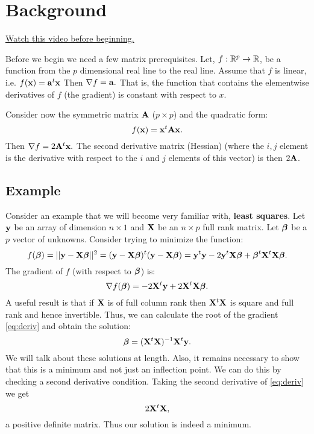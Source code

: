 \chapter{Background}
\label{chap:background}

\href{https://www.youtube.com/watch?v=TrZdG642M4g&index=1&list=PLpl-gQkQivXhdgUCdaUQcdb31CRe8Mm2y}{Watch this video before beginning.}

Before we begin we need a few matrix prerequisites. Let,
$f: \mathbb{R}^p \rightarrow \mathbb{R}$,
be a function from the $p$ dimensional real line to the real line.
Assume that $f$ is linear, i.e. $f(\mathbf{x}) = \mathbf{a}^t \mathbf{x}$
Then $ \nabla f = \mathbf{a}.$ That is, the function that
contains the elementwise derivatives of $f$ (the gradient)
is constant with respect to $x$. 

Consider now the symmetric matrix $\mathbf{A}$
($p\times p$) and the quadratic form:
$$
f(\mathbf{x}) =  \mathbf{x}^t \mathbf{A} \mathbf{x}.
$$
Then  $ \nabla f = 2 \mathbf{A}^t \mathbf{x}.$ The second derivative matrix (Hessian)
(where the $i, j$ element is the derivative
with respect to the $i$ and $j$ elements of this vector)
is then $2 \mathbf{A} $.

\section{Example}

Consider an example that we will become very familiar with, {\bf least squares}.
Let $\mathbf{y}$ be an array of dimension $n\times 1$ and 
$\mathbf{X}$ be an $n\times p$ full rank matrix. Let $\boldsymbol{\beta}$ be a
$p$ vector of unknowns. Consider trying to minimize the function:
$$
f(\boldsymbol{\beta}) = ||\mathbf{y} - \mathbf{X} \boldsymbol{\beta}||^2 = (\mathbf{y} - \mathbf{X} \boldsymbol{\beta})^t (\mathbf{y} - \mathbf{X} \boldsymbol{\beta})
= \mathbf{y}^t \mathbf{y} - 2 \mathbf{y}^t \mathbf{X} \boldsymbol{\beta} + \boldsymbol{\beta}^t \mathbf{X}^t \mathbf{X} \boldsymbol{\beta}.
$$
The gradient of $f$ (with respect to $\boldsymbol{\beta}$) is:
\begin{equation}
\label{eq:deriv}
\nabla f(\boldsymbol{\beta}) = -2 \mathbf{X}^t \mathbf{y} + 2 \mathbf{X}^t\mathbf{X} \boldsymbol{\beta}.
\end{equation}
A useful result is that if $\mathbf{X}$ is of full column rank then
$\mathbf{X}^t \mathbf{X}$ is square and full rank and hence invertible. Thus, we can
calculate the root of the gradient \eqref{eq:deriv} and obtain the solution:
$$
\boldsymbol{\beta} = (\mathbf{X}^t \mathbf{X})^{-1} \mathbf{X}^t \mathbf{y}. 
$$
We will talk about these solutions at length. Also, it remains
necessary to show that this is a minimum and not just an
inflection point. We can do this by checking a second derivative
condition. Taking the second derivative of \eqref{eq:deriv} we 
get
$$
2 \mathbf{X}^t\mathbf{X},
$$
a positive definite matrix. Thus our solution is indeed a minimum.

